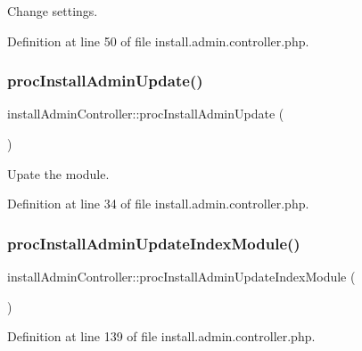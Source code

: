 Change settings. 



Definition at line 50 of file install.\+admin.\+controller.\+php.

\hypertarget{classinstallAdminController_a90423de1ab7aee1f0eb7a48af5d05224}{}\label{classinstallAdminController_a90423de1ab7aee1f0eb7a48af5d05224} 
\subsubsection{\texorpdfstring{proc\+Install\+Admin\+Update()}{procInstallAdminUpdate()}}
{\footnotesize\ttfamily install\+Admin\+Controller\+::proc\+Install\+Admin\+Update (\begin{DoxyParamCaption}{ }\end{DoxyParamCaption})}



Upate the module. 



Definition at line 34 of file install.\+admin.\+controller.\+php.

\hypertarget{classinstallAdminController_ae72e98f16d94d17f94d7cdce7060faed}{}\label{classinstallAdminController_ae72e98f16d94d17f94d7cdce7060faed} 
\subsubsection{\texorpdfstring{proc\+Install\+Admin\+Update\+Index\+Module()}{procInstallAdminUpdateIndexModule()}}
{\footnotesize\ttfamily install\+Admin\+Controller\+::proc\+Install\+Admin\+Update\+Index\+Module (\begin{DoxyParamCaption}{ }\end{DoxyParamCaption})}



Definition at line 139 of file install.\+admin.\+controller.\+php.

\hypertarget{classinstallAdminController_ae7c646732649d1b526f0740d988a4164}{}\label{classinstallAdminController_ae7c646732649d1b526f0740d988a4164} 
